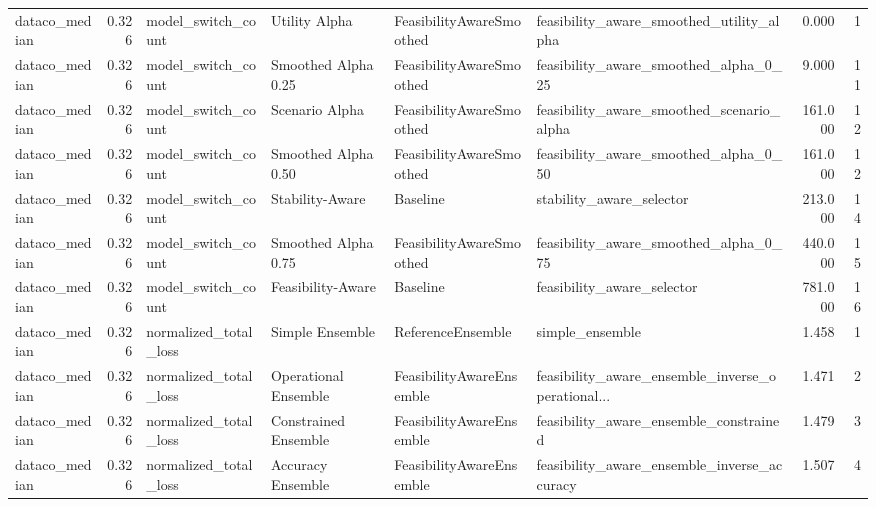 \begin{table}
{\begin{tabular}{lrllllrr}
 dataco\_median &             0.326 &          model\_switch\_count &         Utility Alpha &  FeasibilityAwareSmoothed &           feasibility\_aware\_smoothed\_utility\_alpha &         0.000 &               1 \\
 dataco\_median &             0.326 &          model\_switch\_count &   Smoothed Alpha 0.25 &  FeasibilityAwareSmoothed &              feasibility\_aware\_smoothed\_alpha\_0\_25 &         9.000 &              11 \\
 dataco\_median &             0.326 &          model\_switch\_count &        Scenario Alpha &  FeasibilityAwareSmoothed &          feasibility\_aware\_smoothed\_scenario\_alpha &       161.000 &              12 \\
 dataco\_median &             0.326 &          model\_switch\_count &   Smoothed Alpha 0.50 &  FeasibilityAwareSmoothed &              feasibility\_aware\_smoothed\_alpha\_0\_50 &       161.000 &              12 \\
 dataco\_median &             0.326 &          model\_switch\_count &       Stability-Aware &                  Baseline &                           stability\_aware\_selector &       213.000 &              14 \\
 dataco\_median &             0.326 &          model\_switch\_count &   Smoothed Alpha 0.75 &  FeasibilityAwareSmoothed &              feasibility\_aware\_smoothed\_alpha\_0\_75 &       440.000 &              15 \\
 dataco\_median &             0.326 &          model\_switch\_count &     Feasibility-Aware &                  Baseline &                         feasibility\_aware\_selector &       781.000 &              16 \\
 dataco\_median &             0.326 &       normalized\_total\_loss &       Simple Ensemble &         ReferenceEnsemble &                                    simple\_ensemble &         1.458 &               1 \\
 dataco\_median &             0.326 &       normalized\_total\_loss &  Operational Ensemble &  FeasibilityAwareEnsemble &  feasibility\_aware\_ensemble\_inverse\_operational... &         1.471 &               2 \\
 dataco\_median &             0.326 &       normalized\_total\_loss &  Constrained Ensemble &  FeasibilityAwareEnsemble &             feasibility\_aware\_ensemble\_constrained &         1.479 &               3 \\
 dataco\_median &             0.326 &       normalized\_total\_loss &     Accuracy Ensemble &  FeasibilityAwareEnsemble &        feasibility\_aware\_ensemble\_inverse\_accuracy &         1.507 &               4 \\

\end{tabular}}
\end{table}

